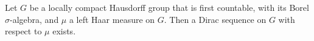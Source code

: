 Let $G$ be a locally compact Hausdorff group that is first countable, with its Borel $\sigma$-algebra, and $\mu$ a
left Haar measure on $G$. Then a Dirac sequence on $G$ with respect to $\mu$ exists.
